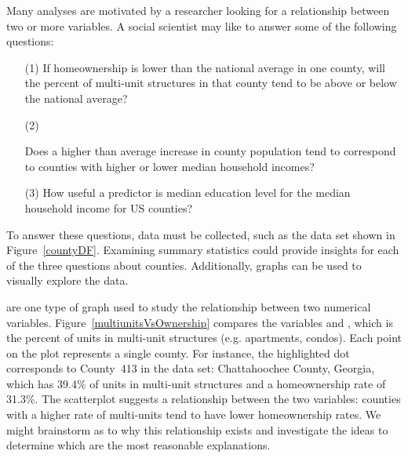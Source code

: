 Many analyses are motivated by a researcher looking
for a relationship between two or more variables.
A social scientist may like to answer some of the
following questions:
\newcommand{\popchangevmedianhhincomequestion}[0]{
    Does a higher than average increase in county population
    tend to correspond to counties with higher or lower median
    household incomes?}%
\begin{enumerate}
\setlength{\itemsep}{0mm}
\item[(1)]\label{ownershipMultiUnitQuestion}
    If homeownership is lower than the national average
    in one county, will the percent of multi-unit structures
    in that county tend to be above or below the national average?
\item[(2)]\label{pop_change_v_median_hh_income_question}
    \popchangevmedianhhincomequestion{}
\item[(3)]\label{isAverageIncomeAssociatedWithSmokingBans}
    How useful a predictor is median education level
    for the median household income for US counties?
\end{enumerate}

To answer these questions, data must be collected, such
as the  data set shown in Figure~\ref{countyDF}.
Examining summary statistics  could
provide insights for each of the three questions about counties.
Additionally, graphs can be used to visually explore the data.

 are one type of graph
used to study the relationship between two numerical variables.
Figure~\ref{multiunitsVsOwnership} compares the variables
 and
,
which is the percent of units in multi-unit structures
(e.g. apartments, condos).
Each point on the plot represents a single county.
For instance, the highlighted dot corresponds to
County~413 in the  data set:
Chattahoochee County, Georgia, which has 39.4\% of
units in multi-unit structures and a homeownership rate
of 31.3\%.
The scatterplot suggests a relationship between the
two variables: counties with a higher rate of multi-units
tend to have lower homeownership rates.
We might brainstorm as to why this relationship exists
and investigate the ideas to determine which are the most
reasonable explanations.

